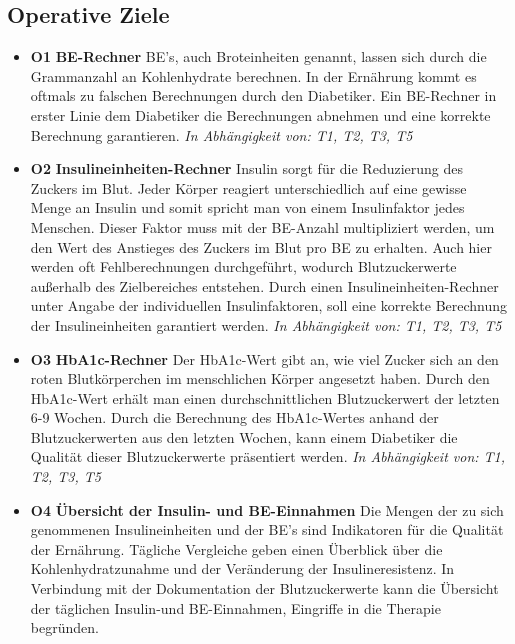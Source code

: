 \documentclass[a4paper,11pt]{article}%
\renewcommand{\\}{\vspace*{0.5\baselineskip} \newline}
\begin{document}
\subsection{Operative Ziele}
\begin{itemize}
	\item \lbrack \textbf{O1}\rbrack  \textbf{ BE-Rechner} \\
	BE’s, auch Broteinheiten genannt, lassen sich durch die Grammanzahl an Kohlenhydrate berechnen. In der Ernährung kommt es oftmals zu falschen Berechnungen durch den Diabetiker. Ein BE-Rechner in erster Linie dem Diabetiker die Berechnungen abnehmen und eine korrekte Berechnung garantieren.\newline
	\emph{In Abhängigkeit von: T1, T2, T3, T5} \\
	\item \lbrack \textbf{O2}\rbrack  \textbf{ Insulineinheiten-Rechner} \\
	Insulin sorgt für die Reduzierung des Zuckers im Blut. Jeder Körper reagiert unterschiedlich auf eine gewisse Menge an Insulin und somit spricht man von einem Insulinfaktor jedes Menschen. Dieser Faktor muss mit der BE-Anzahl multipliziert werden, um den Wert des Anstieges des Zuckers im Blut pro BE zu erhalten. Auch hier werden oft Fehlberechnungen durchgeführt, wodurch Blutzuckerwerte außerhalb des Zielbereiches entstehen. Durch einen Insulineinheiten-Rechner unter Angabe der individuellen Insulinfaktoren, soll eine korrekte Berechnung der Insulineinheiten garantiert werden.\newline
	\emph{In Abhängigkeit von: T1, T2, T3, T5} \\
	\item \lbrack \textbf{O3}\rbrack  \textbf{ HbA1c-Rechner} \\
	Der HbA1c-Wert gibt an, wie viel Zucker sich an den roten Blutkörperchen im menschlichen Körper angesetzt haben. Durch den HbA1c-Wert erhält man einen durchschnittlichen Blutzuckerwert der letzten 6-9 Wochen. Durch die Berechnung des HbA1c-Wertes anhand der Blutzuckerwerten aus den letzten Wochen, kann einem Diabetiker die Qualität dieser Blutzuckerwerte präsentiert werden.\newline
	\emph{In Abhängigkeit von: T1, T2, T3, T5} \\
	\item \lbrack \textbf{O4}\rbrack  \textbf{ Übersicht der Insulin- und BE-Einnahmen} \\
	Die Mengen der zu sich genommenen Insulineinheiten und der BE’s sind Indikatoren für die Qualität der Ernährung. Tägliche Vergleiche geben einen Überblick über die Kohlenhydratzunahme und der Veränderung der Insulineresistenz. In Verbindung mit der Dokumentation der Blutzuckerwerte kann die Übersicht der täglichen Insulin-und BE-Einnahmen, Eingriffe in die Therapie begründen.\newline

\end{itemize}
\end{document}
